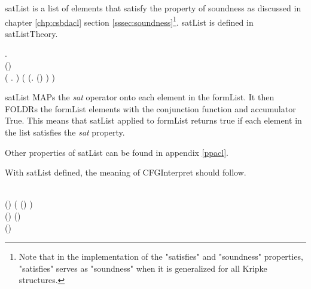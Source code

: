 \documentclass[../../main/main.tex]{subfiles}
\begin{document}
satList is a list of elements that satisfy the property of soundness as discussed in chapter \ref{chp:csbdacl} section \ref{sssec:soundness}\footnote{Note that in the  implementation of the "satisfies" and "soundness" properties, "satisfies" serves as "soundness" when it is generalized for all Kripke structures.}.  satList is defined in satListTheory.  

\begin{tabbing}
\parskip=8pt
\HOLTokenTurnstile{} \hspace{0.3cm}\HOLSymConst{\HOLTokenForall{}}   .\\
\hspace{0.5cm}(\HOLSymConst{,}\HOLSymConst{,})   \HOLSymConst{\HOLTokenEquiv{}} \\
\hspace{0.5cm}  (\HOLTokenLambda{} .  \HOLSymConst{\HOLTokenConj{}} )  ( (\HOLTokenLambda{}. (\HOLSymConst{,}\HOLSymConst{,})  ) )
\parskip=18pt
\end{tabbing}

satList MAPs the \textit{sat} operator onto each element in the formList. It then FOLDRs the formList elements with the conjunction function and accumulator True.  This means that satList applied to formList returns true if each element in the list satisfies the \textit{sat} property.

Other properties of satList can be found in appendix \ref{ppacl}.

With satList defined, the meaning of CFGInterpret should follow.  

\begin{tabbing}
\parskip=8pt
\HOLTokenTurnstile{} \\
\hspace{0.5cm}(\HOLSymConst{,}\HOLSymConst{,})
     (    (\HOLSymConst{::}) 
     ) \HOLSymConst{\HOLTokenEquiv{}} \\
\hspace{0.5cm}(\HOLSymConst{,}\HOLSymConst{,})    \HOLSymConst{\HOLTokenConj{}} (\HOLSymConst{,}\HOLSymConst{,})   \HOLSymConst{\HOLTokenConj{}}\\
\hspace{0.5cm}(\HOLSymConst{,}\HOLSymConst{,})    
\parskip=18pt
\end{tabbing}
\end{document}
